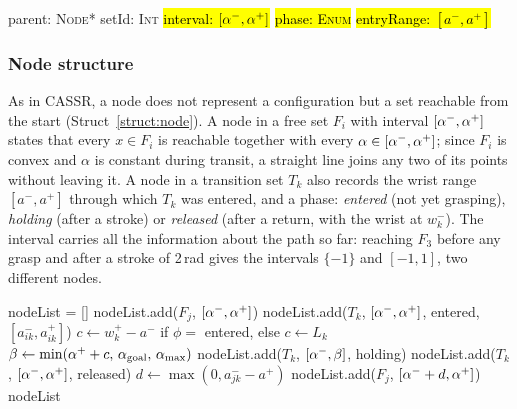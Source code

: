 \begin{nodestruct}[t]
\caption{Node}
\label{struct:node}
\begin{algorithmic}[0]
\State parent: \textsc{Node}* 
\State setId: \textsc{Int} 
\State \hl{interval: $[\alo,\ahi]$} 
\State \hl{phase: \textsc{Enum}} 
\State \hl{entryRange: $[a^-,a^+]$} 
\end{algorithmic}
\end{nodestruct}

\subsubsection{Node structure}
\label{sec:astar:node}
As in CASSR, a node does not represent a configuration but a set reachable
from the start (Struct~\ref{struct:node}). A node in a free set $F_i$ with
interval $[\alo,\ahi]$ states that every $x\in F_i$ is reachable together with
every $\alpha\in[\alpha^{-},\alpha^{+}]$; since $F_i$ is convex and $\alpha$ is constant
during transit, a straight line joins any two of its points without leaving
it. A node
in a transition set $T_k$ also records the wrist range $[a^-,a^+]$ through
which $T_k$ was entered, and a phase: \emph{entered} (not yet grasping),
\emph{holding} (after a stroke) or \emph{released} (after a return, with the
wrist at $w_k^-$). The interval carries all the information about the path so
far: reaching $F_3$ before any grasp and after a stroke of 2\,rad gives the
intervals $\{-1\}$ and $[-1,1]$, two different nodes.

\begin{algorithm}[t]
\caption{expandNode, for a node in set $S$ with interval $[\alo,\ahi]$, phase
$\phi$ and entry range $[a^-,a^+]$}
\label{alg:expand}
\begin{algorithmic}[1]
\State nodeList = []
   
    \State nodeList.add($F_j$, $[\alo,\ahi]$)
  \EndFor
   
    \State nodeList.add($T_k$, $[\alo,\ahi]$, entered, $[a_{ik}^-,a_{ik}^+]$)
  \EndFor
\Else {}
   
    \State $c\gets w_k^+-a^-$ if $\phi=$ entered, else $c\gets L_k$
    \State $\beta\gets\min(\alpha^{+}+c,\,\alpha_{\mathrm{goal}},\,\alpha_{\max})$
    \State nodeList.add($T_k$, $[\alpha^{-},\beta]$, holding)
  \EndIf
   
    \State nodeList.add($T_k$, $[\alo,\ahi]$, released)
  \EndIf
   
      \State $d\gets\max(0,a_{jk}^- - a^+)$ 
        \State nodeList.add($F_j$, $[\alpha^{-}+d,\alpha^{+}]$)
      \EndIf
    \EndFor
  \EndIf
\EndIf
\State \Return nodeList
\end{algorithmic}
\end{algorithm}

